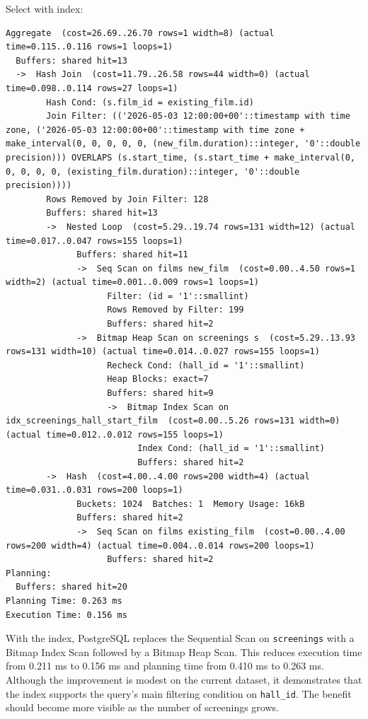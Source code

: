 \documentclass[11pt, a4paper]{article}
\begin{document}
Select with index:
\begin{lstlisting}
Aggregate  (cost=26.69..26.70 rows=1 width=8) (actual time=0.115..0.116 rows=1 loops=1)
  Buffers: shared hit=13
  ->  Hash Join  (cost=11.79..26.58 rows=44 width=0) (actual time=0.098..0.114 rows=27 loops=1)
        Hash Cond: (s.film_id = existing_film.id)
        Join Filter: (('2026-05-03 12:00:00+00'::timestamp with time zone, ('2026-05-03 12:00:00+00'::timestamp with time zone + make_interval(0, 0, 0, 0, 0, (new_film.duration)::integer, '0'::double precision))) OVERLAPS (s.start_time, (s.start_time + make_interval(0, 0, 0, 0, 0, (existing_film.duration)::integer, '0'::double precision))))
        Rows Removed by Join Filter: 128
        Buffers: shared hit=13
        ->  Nested Loop  (cost=5.29..19.74 rows=131 width=12) (actual time=0.017..0.047 rows=155 loops=1)
              Buffers: shared hit=11
              ->  Seq Scan on films new_film  (cost=0.00..4.50 rows=1 width=2) (actual time=0.001..0.009 rows=1 loops=1)
                    Filter: (id = '1'::smallint)
                    Rows Removed by Filter: 199
                    Buffers: shared hit=2
              ->  Bitmap Heap Scan on screenings s  (cost=5.29..13.93 rows=131 width=10) (actual time=0.014..0.027 rows=155 loops=1)
                    Recheck Cond: (hall_id = '1'::smallint)
                    Heap Blocks: exact=7
                    Buffers: shared hit=9
                    ->  Bitmap Index Scan on idx_screenings_hall_start_film  (cost=0.00..5.26 rows=131 width=0) (actual time=0.012..0.012 rows=155 loops=1)
                          Index Cond: (hall_id = '1'::smallint)
                          Buffers: shared hit=2
        ->  Hash  (cost=4.00..4.00 rows=200 width=4) (actual time=0.031..0.031 rows=200 loops=1)
              Buckets: 1024  Batches: 1  Memory Usage: 16kB
              Buffers: shared hit=2
              ->  Seq Scan on films existing_film  (cost=0.00..4.00 rows=200 width=4) (actual time=0.004..0.014 rows=200 loops=1)
                    Buffers: shared hit=2
Planning:
  Buffers: shared hit=20
Planning Time: 0.263 ms
Execution Time: 0.156 ms
\end{lstlisting}

With the index, PostgreSQL replaces the Sequential Scan on \texttt{screenings} with a Bitmap Index Scan followed by a Bitmap Heap Scan.
This reduces execution time from 0.211 ms to 0.156 ms and planning time from 0.410 ms to 0.263 ms.
Although the improvement is modest on the current dataset, it demonstrates that the index supports the query's main filtering condition on \texttt{hall\_id}.
The benefit should become more visible as the number of screenings grows.
\end{document}
